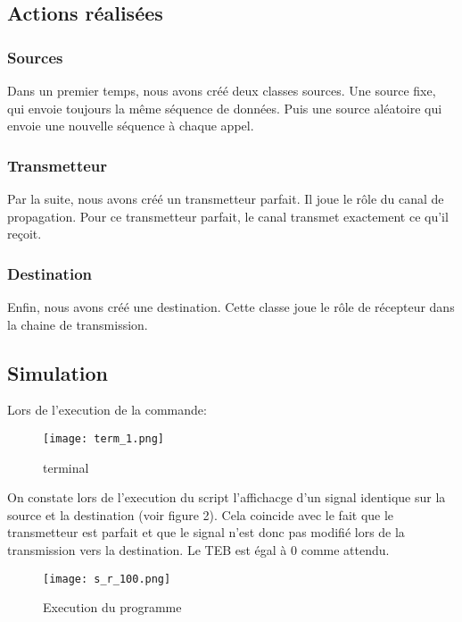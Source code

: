 \subsection{Actions réalisées}

\subsubsection{Sources}

Dans un premier temps, nous avons créé deux classes sources. Une source fixe, qui envoie toujours la même séquence de données. Puis une source aléatoire qui envoie une nouvelle séquence à chaque appel.

\subsubsection{Transmetteur}

Par la suite, nous avons créé un transmetteur parfait. Il joue le rôle du canal de propagation. Pour ce transmetteur parfait, le canal transmet exactement ce qu'il reçoit.

\subsubsection{Destination}

Enfin, nous avons créé une destination. Cette classe joue le rôle de récepteur dans la chaine de transmission.

\subsection{Simulation}

Lors de l'execution de la commande: 

\begin{figure}[H]
    \centering
    \texttt{[image: term\_1.png]}
    \caption{terminal}
\end{figure}

On constate lors de l'execution du script l'affichacge d'un signal identique sur la source et la destination (voir figure 2). Cela coincide 
avec le fait que le transmetteur est parfait et que le signal n'est donc pas modifié lors de la transmission vers la destination.
Le TEB est égal à 0 comme attendu.

\begin{figure}[H]
    \centering
    \texttt{[image: s\_r\_100.png]}
    \caption{Execution du programme}
\end{figure}

